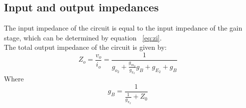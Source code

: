 \subsection{Input and output impedances}
The input impedance of the circuit is equal to the input impedance of the gain stage, which can be determined by equation ~\ref{eq:zi}. \\
The total output impedance of the circuit is given by:
\begin{equation}
    Z_o =\frac{v_o}{i_o} =\frac{1}{g_{o_2}+\frac{g_{m_2}}{g_{\pi_2}}g_B+g_{E_2}+g_B}
\end{equation}
Where 
\begin{equation}
    g_B=\frac{1}{\frac{1}{g_{\pi_2}}+Z_0}
\end{equation}


